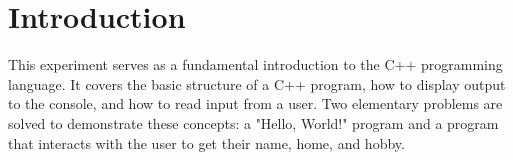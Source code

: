 \section{Introduction}

This experiment serves as a fundamental introduction to the C++ programming language. It covers the basic structure of a C++ program, how to display output to the console, and how to read input from a user. Two elementary problems are solved to demonstrate these concepts: a "Hello, World!" program and a program that interacts with the user to get their name, home, and hobby.
